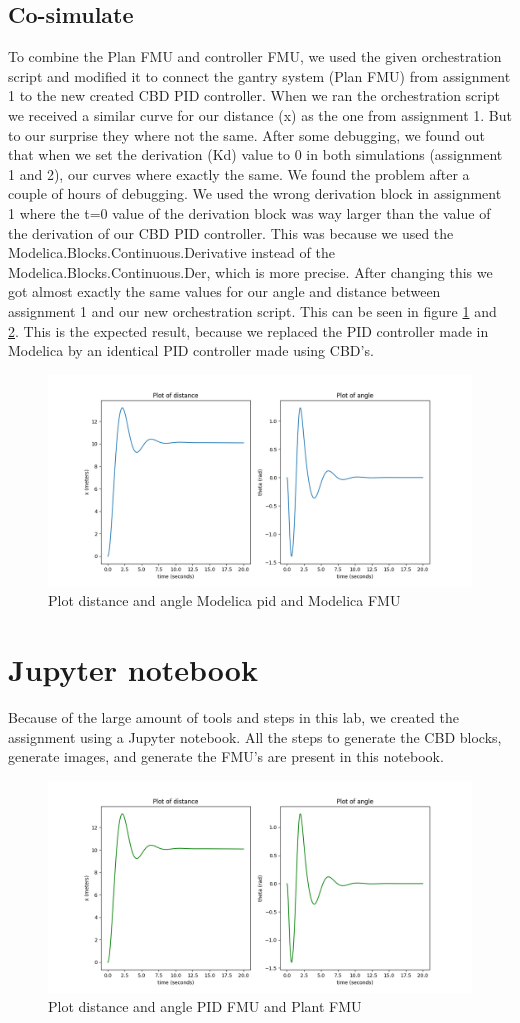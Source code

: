 \documentclass{article}
\begin{document}
\subsection{Co-simulate}
To combine the Plan FMU and controller FMU, we used the given orchestration script and modified it to connect the gantry system (Plan FMU) from assignment 1 to the new created CBD PID controller. When we ran the orchestration script we received a similar curve for our distance (x) as the one from assignment 1. But to our surprise they where not the same. After some debugging, we found out that when we set the derivation (Kd) value to 0 in both simulations (assignment 1 and 2), our curves where exactly the same. We found the problem after a couple of hours of debugging. We used the wrong derivation block in assignment 1 where the t=0 value of the derivation block was way larger than the value of the derivation of our CBD PID controller. This was because we used the Modelica.Blocks.Continuous.Derivative instead of the Modelica.Blocks.Continuous.Der, which is more precise. After changing this we got almost exactly the same values for our angle and distance between assignment 1 and our new orchestration script. This can be seen in figure \ref{fig:assigment1_plot} and \ref{fig:assigment2_plot}. This is the expected result, because we replaced the PID controller made in Modelica by an identical PID controller made using CBD's.

\begin{figure}
    \centering
    \includegraphics[width=0.75\linewidth]{Images/assigment1_plot.png}
    \caption{Plot distance and angle Modelica pid and Modelica FMU}
    \label{fig:assigment1_plot}
\end{figure}


\section{Jupyter notebook}
Because of the large amount of tools and steps in this lab, we created the assignment using a Jupyter notebook. All the steps to generate the CBD blocks, generate images, and generate the FMU's are present in this notebook.

\begin{figure}
    \centering
    \includegraphics[width=0.75\linewidth]{Images/assigment2_plot.png}
    \caption{Plot distance and angle PID FMU and Plant FMU}
    \label{fig:assigment2_plot}
\end{figure}
\end{document}

